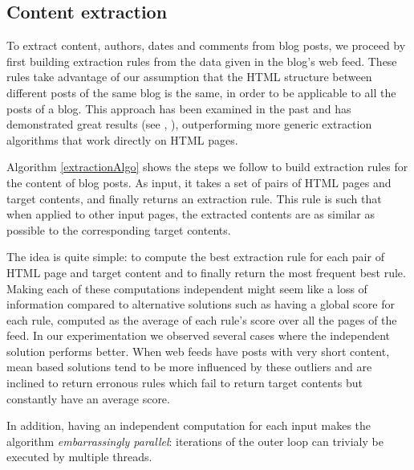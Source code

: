 \subsection{Content extraction}
To extract content, authors, dates and comments from blog posts, we proceed by first building extraction rules from the data given in the blog's web feed. These rules take advantage of our assumption that the HTML structure between different posts of the same blog is the same, in order to be applicable to all the posts of a blog. This approach has been examined in the past and has demonstrated great results (see \cite{gkotsis2013}, \cite{oita2010}), outperforming more generic extraction algorithms that work directly on HTML pages.

\extractionAlgo

Algorithm \ref{extractionAlgo} shows the steps we follow to build extraction rules for the content of blog posts. As input, it takes a set of pairs of HTML pages and target contents, and finally returns an extraction rule. This rule is such that when applied to other input pages, the extracted contents are as similar as possible to the corresponding target contents.

The idea is quite simple: to compute the best extraction rule for each pair of HTML page and target content and to finally return the most frequent best rule. Making each of these computations independent might seem like a loss of information compared to alternative solutions such as having a global score for each rule, computed as the average of each rule's score over all the pages of the feed. In our experimentation we observed several cases where the independent solution performs better. When web feeds have posts with very short content, mean based solutions tend to be more influenced by these outliers and are inclined to return erronous rules which fail to return target contents but constantly have an average score.

In addition, having an independent computation for each input makes the algorithm \emph{embarrassingly parallel}: iterations of the outer loop can trivialy be executed by multiple threads.


